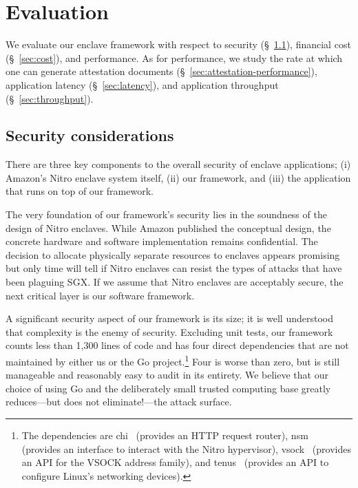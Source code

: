 \section{Evaluation}
\label{sec:evaluation}

We evaluate our enclave framework with respect to
security (\S~\ref{sec:security}),
financial cost (\S~\ref{sec:cost}), and performance.  As for performance, we
study the rate at which one can generate
attestation documents (\S~\ref{sec:attestation-performance}),
application latency (\S~\ref{sec:latency}),
and application throughput (\S~\ref{sec:throughput}).

\subsection{Security considerations}
\label{sec:security}


There are three key components to the overall security of enclave applications;
(i) Amazon's Nitro enclave system itself,
(ii) our framework, and
(iii) the application that runs on top of our framework.

The very foundation of our framework's security lies in the soundness of the
design of Nitro enclaves.  While Amazon published the conceptual design, the
concrete hardware and software implementation remains confidential.  The
decision to allocate physically separate resources to enclaves appears promising
but only time will tell if Nitro enclaves can resist the types of attacks that
have been plaguing SGX.  If we assume that Nitro enclaves are acceptably
secure, the next critical layer is our software framework.

A significant security aspect of our framework is its size; it is well
understood that complexity is the enemy of security.  Excluding unit tests, our
framework counts less than 1,300 lines of code and has four direct dependencies
that are not maintained by either us or the Go project.\footnote{The
dependencies are chi~\cite{chi} (provides an HTTP request router),
nsm~\cite{nsm} (provides an interface to interact with the Nitro hypervisor),
vsock~\cite{vsock} (provides an API for the VSOCK address family), and
tenus~\cite{tenus} (provides an API to configure Linux's networking devices).}
Four is worse than zero, but is still manageable and reasonably easy to audit in
its entirety.  We believe that our choice of using Go and the deliberately small
trusted computing base greatly reduces---but does not eliminate!---the attack
surface.

